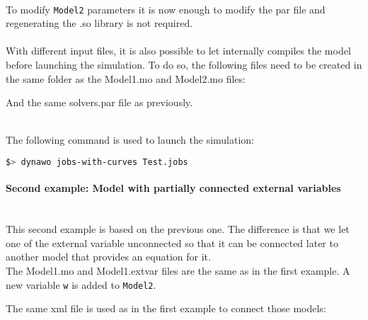 \documentclass[a4paper, 12pt]{report}
\begin{document}
~~\\
To modify \lstinline[language=Modelica]{Model2} parameters it is now enough to modify the par file and regenerating the .so library is not required. \\

~~\\
With different input files, it is also possible to let \Dynawo internally compiles the model before launching the simulation. To do so, the following files need to be created in the same folder as the Model1.mo and Model2.mo files:




And the same solvers.par file as previously.

~~\\
The following command is used to launch the simulation:
\begin{lstlisting}[language=bash,deletekeywords={jobs,help}]
$> dynawo jobs-with-curves Test.jobs
\end{lstlisting}


\paragraph{Second example: Model with partially connected external variables}
 ~~\\
This second example is based on the previous one. The difference is that we let one of the external variable unconnected so that it can be connected later to another model that provides an equation for it. \\
The Model1.mo and Model1.extvar files are the same as in the first example.
A new variable \lstinline[language=Modelica]{w} is added to
\lstinline[language=Modelica]{Model2}.



The same xml file is used as in the first example to connect those models:

\end{document}
